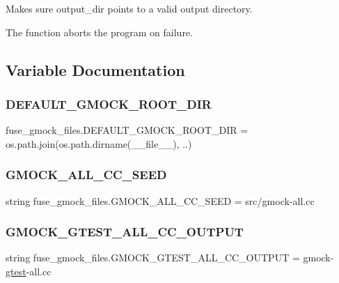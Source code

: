 \begin{DoxyVerb}Makes sure output_dir points to a valid output directory.

The function aborts the program on failure.
\end{DoxyVerb}
 

\subsection{Variable Documentation}
\mbox{\label{namespacefuse__gmock__files_a900b64b34e20c7430b72252192a3c7ed}} 
\subsubsection{\texorpdfstring{DEFAULT\_GMOCK\_ROOT\_DIR}{DEFAULT\_GMOCK\_ROOT\_DIR}}
{\footnotesize\ttfamily fuse\+\_\+gmock\+\_\+files.\+D\+E\+F\+A\+U\+L\+T\+\_\+\+G\+M\+O\+C\+K\+\_\+\+R\+O\+O\+T\+\_\+\+D\+IR = os.\+path.\+join(os.\+path.\+dirname(\+\_\+\+\_\+file\+\_\+\+\_\+), \textquotesingle{}..\textquotesingle{})}

\mbox{\label{namespacefuse__gmock__files_a518e1f3cc3f184747e6ed3f2d0233c99}} 
\subsubsection{\texorpdfstring{GMOCK\_ALL\_CC\_SEED}{GMOCK\_ALL\_CC\_SEED}}
{\footnotesize\ttfamily string fuse\+\_\+gmock\+\_\+files.\+G\+M\+O\+C\+K\+\_\+\+A\+L\+L\+\_\+\+C\+C\+\_\+\+S\+E\+ED = \textquotesingle{}src/gmock-\/all.\+cc\textquotesingle{}}

\mbox{\label{namespacefuse__gmock__files_a9759f3f6c404e3292c26c9317792e846}} 
\subsubsection{\texorpdfstring{GMOCK\_GTEST\_ALL\_CC\_OUTPUT}{GMOCK\_GTEST\_ALL\_CC\_OUTPUT}}
{\footnotesize\ttfamily string fuse\+\_\+gmock\+\_\+files.\+G\+M\+O\+C\+K\+\_\+\+G\+T\+E\+S\+T\+\_\+\+A\+L\+L\+\_\+\+C\+C\+\_\+\+O\+U\+T\+P\+UT = \textquotesingle{}gmock-\/\mbox{\hyperlink{namespacefuse__gmock__files_a3fb36dbe8d361f9ecc54e1aa4b94b068}{gtest}}-\/all.\+cc\textquotesingle{}}

